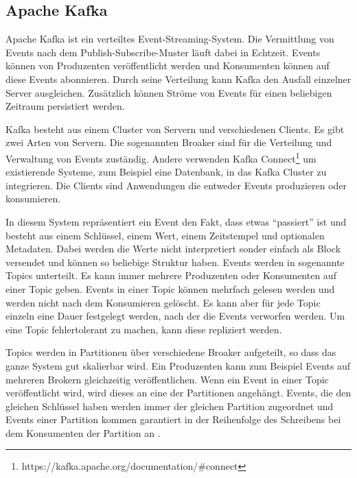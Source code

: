 \subsection{Apache Kafka}
\label{sec:kafka}

Apache Kafka ist ein verteiltes Event-Streaming-System.
Die Vermittlung von Events nach dem Publish-Subscribe-Muster läuft dabei in Echtzeit.
Events können von Produzenten veröffentlicht werden und Konsumenten können auf diese Events abonnieren.
Durch seine Verteilung kann Kafka den Ausfall einzelner Server ausgleichen.
Zusätzlich können Ströme von Events für einen beliebigen Zeitraum persistiert werden.

Kafka besteht aus einem Cluster von Servern und verschiedenen Clients.
Es gibt zwei Arten von Servern.
Die sogenannten Broaker sind für die Verteilung und Verwaltung von Events zuständig.
Andere verwenden Kafka Connect\footnote{https://kafka.apache.org/documentation/\#connect} um existierende Systeme, zum Beispiel eine Datenbank, in das Kafka Cluster zu integrieren.
Die Clients sind Anwendungen die entweder Events produzieren oder konsumieren.

In diesem System repräsentiert ein Event den Fakt, dass etwas "`passiert"' ist und besteht aus einem Schlüssel, einem Wert, einem Zeitstempel und optionalen Metadaten.
Dabei werden die Werte nicht interpretiert sonder einfach als Block versendet und können so beliebige Struktur haben.
Events werden in sogenannte Topics unterteilt.
Es kann immer mehrere Produzenten oder Konsumenten auf einer Topic geben.
Events in einer Topic können mehrfach gelesen werden und werden nicht nach dem Konsumieren gelöscht.
Es kann aber für jede Topic einzeln eine Dauer festgelegt werden, nach der die Events verworfen werden.
Um eine Topic fehlertolerant zu machen, kann diese repliziert werden.

Topics werden in Partitionen über verschiedene Broaker aufgeteilt, so dass das ganze System gut skalierbar wird.
Ein Produzenten kann zum Beispiel Events auf mehreren Brokern gleichzeitig veröffentlichen.
Wenn ein Event in einer Topic veröffentlicht wird, wird dieses an eine der Partitionen angehängt.
Events, die den gleichen Schlüssel haben werden immer der gleichen Partition zugeordnet und Events einer Partition kommen garantiert in der Reihenfolge des Schreibens bei dem Konsumenten der Partition an \parencite{kafka-docs}.